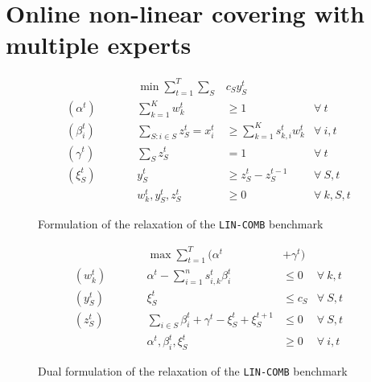 
\section{Online non-linear covering with multiple experts}


\begin{figure}[ht]
	\begin{mdframed}
		\begin{align*}
			&& \min \sum_{t = 1}^{T} \sum_{S} & c_S y_S^t \\
			(\alpha^{t}) \qquad && \sum_{k=1}^{K} w_{k}^{t} & \geq 1  & \forall\ t \\
			(\beta_{i}^{t}) \qquad && \sum_{S: i \in S} z_{S}^{t} = x_{i}^{t} &\geq \sum_{k=1}^{K} s_{k,i}^{t} w_{k}^{t}   &\forall\ i,t\\
			(\gamma^{t}) \qquad && \sum_{S} z_{S}^{t} &= 1   &\forall\ t\\
			(\xi_{S}^{t}) \qquad && y_{S}^{t} &\geq z_{S}^{t} - z_{S}^{t-1}   &\forall\ S,t\\
			&& w_{k}^{t}, y_{S}^{t}, z_{S}^{t} & \ge 0 & \forall\ k,S,t
		\end{align*}
	\end{mdframed}
	\caption{Formulation of the relaxation of the \texttt{LIN-COMB} benchmark}
	\label{fig:relaxation}
\end{figure}

\begin{figure}[ht]
	\begin{mdframed}
		\begin{align*}
			&& \max \sum_{t=1}^{T}  (\alpha^{t} &+ \gamma^{t}) \\
			(w_{k}^{t}) \qquad && \alpha^{t} - \sum_{i=1}^{n} s_{i,k}^{t} \beta_{i}^{t}  &\leq 0  &\forall\ k,t\\
			(y_{S}^{t}) \qquad && \xi_{S}^{t}   &\leq c_{S}  &\forall\ S,t \\
			(z_{S}^{t}) \qquad && \sum_{i \in S}\beta_{i}^{t} + \gamma^{t} - \xi_{S}^{t} + \xi_{S}^{t+1}  &\leq 0  &\forall\ S,t \\
			&& \alpha^{t}, \beta_{i}^{t}, \xi_{S}^{t} & \ge 0 & \forall\ i,t
		\end{align*}
	\end{mdframed}
	\caption{Dual formulation of the relaxation of the \texttt{LIN-COMB} benchmark}
	\label{fig:dual}
\end{figure}


